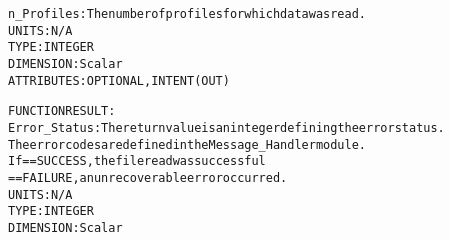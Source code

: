 \begin{alltt}
        n_Profiles:   The number of profiles for which data was read.
                      UNITS:      N/A
                      TYPE:       INTEGER
                      DIMENSION:  Scalar
                      ATTRIBUTES: OPTIONAL, INTENT(OUT)
 
 
  FUNCTION RESULT:
        Error_Status: The return value is an integer defining the error status.
                      The error codes are defined in the Message_Handler module.
                      If == SUCCESS, the file read was successful
                         == FAILURE, an unrecoverable error occurred.
                      UNITS:      N/A
                      TYPE:       INTEGER
                      DIMENSION:  Scalar
 
  \end{alltt}
